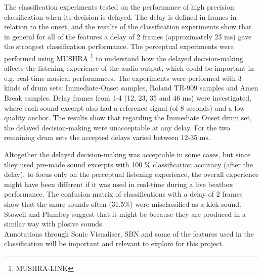 The classification experiments tested on the performance of high precision classification when its decision is delayed.
The delay is defined in frames in relation to the onset, and the results of the classification experiments show that in general for all of the features a delay of 2 frames (approximately 23 ms) gave the strongest classification performance.
The perceptual experiments were performed using MUSHRA \footnote{MUSHRA-LINK} to understand how the delayed decision-making affects the listening experience of the audio output, which could be important in e.g. real-time musical performances. The experiments were performed with 3 kinds of drum sets: Immediate-Onset samples, Roland TR-909 samples and Amen Break samples. Delay frames from 1-4 (12, 23, 35 and 46 ms) were investigated, where each sound excerpt also had a reference signal (of 8 seconds) and a low quality anchor. The results show that regarding the Immediate Onset drum set, the delayed decision-making were unacceptable at any delay. For the two remaining drum sets the accepted delays varied between 12-35 ms.


Altogether the delayed decision-making was acceptable in some cases, but since they used pre-made sound excerpts with 100 \% classification accuracy (after the delay), to focus only on the perceptual listening experience, the overall experience might have been different if it was used in real-time during a live beatbox performance. 
The confusion matrix of classifications with a delay of 2 frames show that the snare sounds often (31.5\%) were misclassified as a kick sound. Stowell and Plumbey suggest that it might be because they are produced in a similar way with plosive sounds. \\
Annotations through Sonic Visualiser, SBN and some of the features used in the classification will be important and relevant to explore for this project.